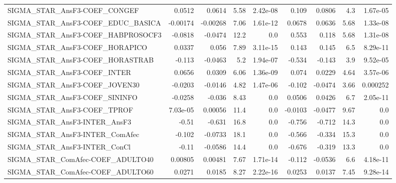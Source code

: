 \begin{tabular}{lrrrrrrrr}
SIGMA\_STAR\_AnsF3-COEF\_CONGEF        &      0.0512 &       0.0614 &    5.58 & 2.42e-08 &      0.109 &      0.0806 &          4.3 &      1.67e-05 \\
SIGMA\_STAR\_AnsF3-COEF\_EDUC\_BASICA   &    -0.00174 &     -0.00268 &    7.06 & 1.61e-12 &     0.0678 &      0.0636 &         5.68 &      1.33e-08 \\
SIGMA\_STAR\_AnsF3-COEF\_HABPROSOCF3   &     -0.0818 &      -0.0474 &    12.2 &      0.0 &      0.553 &       0.118 &         5.68 &      1.31e-08 \\
SIGMA\_STAR\_AnsF3-COEF\_HORAPICO      &      0.0337 &        0.056 &    7.89 & 3.11e-15 &      0.143 &       0.145 &          6.5 &      8.29e-11 \\
SIGMA\_STAR\_AnsF3-COEF\_HORASTRAB     &      -0.113 &      -0.0463 &     5.2 & 1.94e-07 &     -0.534 &      -0.143 &          3.9 &      9.52e-05 \\
SIGMA\_STAR\_AnsF3-COEF\_INTER         &      0.0656 &       0.0309 &    6.06 & 1.36e-09 &      0.074 &      0.0229 &         4.64 &      3.57e-06 \\
SIGMA\_STAR\_AnsF3-COEF\_JOVEN30       &     -0.0203 &      -0.0146 &    4.82 & 1.47e-06 &     -0.102 &     -0.0474 &         3.66 &      0.000252 \\
SIGMA\_STAR\_AnsF3-COEF\_SININFO       &     -0.0258 &       -0.036 &    8.43 &      0.0 &     0.0506 &      0.0426 &          6.7 &      2.05e-11 \\
SIGMA\_STAR\_AnsF3-COEF\_TPROF         &    7.03e-05 &      0.00056 &    11.4 &      0.0 &    -0.0103 &     -0.0477 &         9.67 &           0.0 \\
SIGMA\_STAR\_AnsF3-INTER\_AnsF3        &       -0.51 &       -0.631 &    16.8 &      0.0 &     -0.756 &      -0.712 &         14.3 &           0.0 \\
SIGMA\_STAR\_AnsF3-INTER\_ComAfec      &      -0.102 &      -0.0733 &    18.1 &      0.0 &     -0.566 &      -0.334 &         15.3 &           0.0 \\
SIGMA\_STAR\_AnsF3-INTER\_ConCl        &       -0.11 &      -0.0586 &    14.4 &      0.0 &     -0.676 &      -0.319 &         13.3 &           0.0 \\
SIGMA\_STAR\_ComAfec-COEF\_ADULTO40    &     0.00805 &      0.00481 &    7.67 & 1.71e-14 &     -0.112 &     -0.0536 &          6.6 &      4.18e-11 \\
SIGMA\_STAR\_ComAfec-COEF\_ADULTO60    &      0.0271 &       0.0185 &    8.27 & 2.22e-16 &     0.0253 &      0.0137 &         7.45 &      9.28e-14 \\

\end{tabular}

